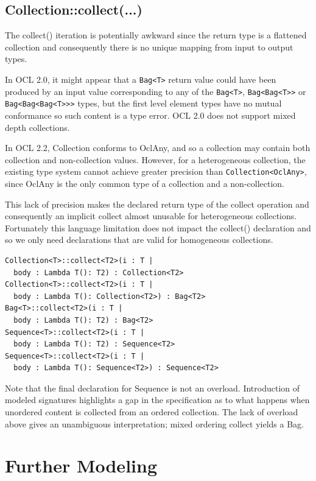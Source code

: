 \documentclass{eceasst}
\begin{document}
\subsection{Collection::collect(...)}

The collect() iteration is potentially awkward since the return type is a flattened collection and consequently there is no unique mapping from input to output types. 

In OCL 2.0, it might appear that a \verb!Bag<T>! return value could have been produced by an input value corresponding to any of the \verb!Bag<T>!, \verb!Bag<Bag<T>>! or \verb!Bag<Bag<Bag<T>>>! types, but the first level element types have no mutual conformance so such content is a type error. OCL 2.0 does not support mixed depth collections.

In OCL 2.2, Collection conforms to OclAny, and so a collection may contain both collection and non-collection values. However,  for a heterogeneous collection, the existing type system cannot achieve greater precision than  \verb!Collection<OclAny>!, since OclAny is the only common type of a collection and a non-collection.

This lack of precision makes the declared return type of the collect operation and consequently an implicit collect almost unusable for heterogeneous collections. Fortunately this language limitation does not impact the collect() declaration and so  we only need declarations that are valid for homogeneous collections.

\begin{verbatim}
Collection<T>::collect<T2>(i : T |
  body : Lambda T(): T2) : Collection<T2>
Collection<T>::collect<T2>(i : T |
  body : Lambda T(): Collection<T2>) : Bag<T2>
Bag<T>::collect<T2>(i : T |
  body : Lambda T(): T2) : Bag<T2>
Sequence<T>::collect<T2>(i : T |
  body : Lambda T(): T2) : Sequence<T2>
Sequence<T>::collect<T2>(i : T |
  body : Lambda T(): Sequence<T2>) : Sequence<T2>
\end{verbatim}

Note that the final declaration for Sequence is not an overload. Introduction of modeled signatures highlights a gap in the specification as to what happens when unordered content is collected from an ordered collection. The lack of overload above gives an unambiguous interpretation; mixed ordering collect yields a Bag.

\section{Further Modeling}\label{FurtherModeling}
\end{document}
